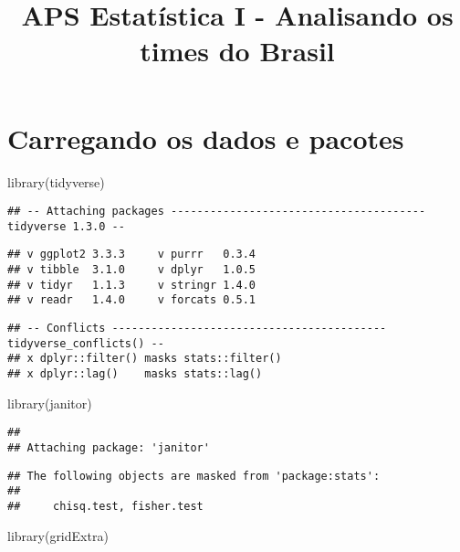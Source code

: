 \documentclass[
]{article}
\title{APS Estatística I - Analisando os times do Brasil}
\author{}
\date{\vspace{-2.5em}}
\newenvironment{Shaded}{\begin{snugshade}}{\end{snugshade}}
\newcommand{\FunctionTok}[1]{\textcolor[rgb]{0.00,0.00,0.00}{#1}}
\newcommand{\NormalTok}[1]{#1}
\begin{document}
\maketitle

\hypertarget{carregando-os-dados-e-pacotes}{%
\section{Carregando os dados e
pacotes}\label{carregando-os-dados-e-pacotes}}

\begin{Shaded}
\begin{Highlighting}[]
\FunctionTok{library}\NormalTok{(tidyverse)}
\end{Highlighting}
\end{Shaded}

\begin{verbatim}
## -- Attaching packages --------------------------------------- tidyverse 1.3.0 --
\end{verbatim}

\begin{verbatim}
## v ggplot2 3.3.3     v purrr   0.3.4
## v tibble  3.1.0     v dplyr   1.0.5
## v tidyr   1.1.3     v stringr 1.4.0
## v readr   1.4.0     v forcats 0.5.1
\end{verbatim}

\begin{verbatim}
## -- Conflicts ------------------------------------------ tidyverse_conflicts() --
## x dplyr::filter() masks stats::filter()
## x dplyr::lag()    masks stats::lag()
\end{verbatim}

\begin{Shaded}
\begin{Highlighting}[]
\FunctionTok{library}\NormalTok{(janitor)}
\end{Highlighting}
\end{Shaded}

\begin{verbatim}
## 
## Attaching package: 'janitor'
\end{verbatim}

\begin{verbatim}
## The following objects are masked from 'package:stats':
## 
##     chisq.test, fisher.test
\end{verbatim}

\begin{Shaded}
\begin{Highlighting}[]
\FunctionTok{library}\NormalTok{(gridExtra)}
\end{Highlighting}
\end{Shaded}
\end{document}
